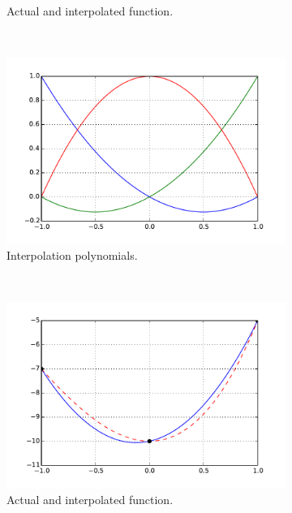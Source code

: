 \begin{figure}[H]
\begin{subfigure}[b]{0.45\textwidth}
		\caption{Actual and interpolated function.}
	\end{subfigure}\\
%
\centering
	\begin{subfigure}[b]{0.45\textwidth}\qquad
		\includegraphics[width=\textwidth]{quadra.pdf}
		\caption{Interpolation polynomials.}
	\end{subfigure}\,
%
	\begin{subfigure}[b]{0.45\textwidth}\qquad
		\includegraphics[width=\textwidth]{interqua.pdf}
		\caption{Actual and interpolated function.}
	\end{subfigure}\\
%
\centering
	\begin{subfigure}[b]{0.45\textwidth}\qquad

\end{subfigure}
\end{figure}
